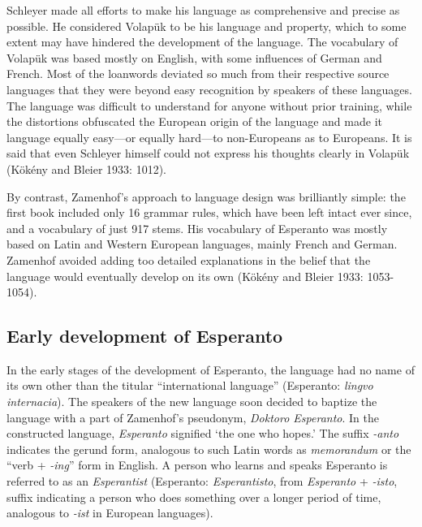 Schleyer made all efforts to make his language as comprehensive and precise as possible.
He considered Volapük to be his language and property, which to some extent may have hindered the development of the language.
The vocabulary of Volapük was based mostly on English, with some influences of German and French.
Most of the loanwords deviated so much from their respective source languages that they were beyond easy recognition by speakers of these languages.
The language was difficult to understand for anyone without prior training, while the distortions obfuscated the European origin of the language and made it language equally easy---or equally hard---to non-Europeans as to Europeans.
It is said that even Schleyer himself could not express his thoughts clearly in Volapük
(Kökény and Bleier 1933: 1012).

By contrast, Zamenhof's approach to language design was brilliantly simple: the first book included only 16 grammar rules, which have been left intact ever since, and a vocabulary of just 917 stems.
His vocabulary of Esperanto was mostly based on Latin and Western European languages, mainly French and German.
Zamenhof avoided adding too detailed explanations in the belief that the language would eventually develop on its own
(Kökény and Bleier 1933: 1053-1054).

\subsection{Early development of Esperanto}

In the early stages of the development of Esperanto, the language had no name of its own other than the titular ``international language'' (Esperanto: \textit{lingvo internacia}).
The speakers of the new language soon decided to baptize the language with a part of Zamenhof's pseudonym, \textit{Doktoro Esperanto}.
In the constructed language, \textit{Esperanto} signified `the one who hopes.' The suffix \textit{-anto} indicates the gerund form, analogous to such Latin words as \textit{memorandum} or the ``verb + \textit{-ing}'' form in English.
A person who learns and speaks Esperanto is referred to as an \textit{Esperantist} (Esperanto: \textit{Esperantisto}, from \textit{Esperanto} + \textit{-isto}, suffix indicating a person who does something over a longer period of time, analogous to \textit{-ist} in European languages).

